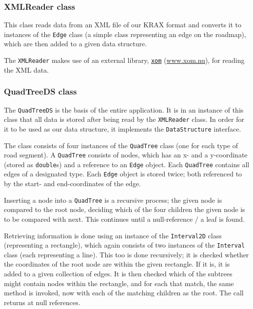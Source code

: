 \documentclass[a4paper,11pt]{article}
\begin{document}
\subsubsection{XMLReader class} %
This class reads data from an XML file of our KRAX format and converts it to instances of the \texttt{Edge} class (a simple class representing an edge on the roadmap), which are then added to a given data structure.

The \texttt{XMLReader} makes use of an external library, \href{www.xom.nu}{\texttt{xom}} (\url{www.xom.nu}), for reading the XML data.

\subsubsection{QuadTreeDS class} %
The \texttt{QuadTreeDS} is the basis of the entire application. It is in an instance of this class that all data is stored after being read by the \texttt{XMLReader} class. In order for it to be used as our data structure, it implements the \texttt{DataStructure} interface.

The class consists of four instances of the \texttt{QuadTree} class (one for each type of road segment). A \texttt{QuadTree} consists of nodes, which has an x- and a y-coordinate (stored as \texttt{double}s) and a reference to an \texttt{Edge} object. Each \texttt{QuadTree} contains all edges of a designated type. Each \texttt{Edge} object is stored twice; both referenced to by the start- and end-coordinates of the edge.

Inserting a node into a \texttt{QuadTree} is a recursive process; the given node is compared to the root node, deciding which of the four children the given node is to be compared with next. This continues until a null-reference / a leaf is found.

Retrieving information is done using an instance of the \texttt{Interval2D} class (representing a rectangle), which again consists of two instances of the \texttt{Interval} class (each representing a line). This too is done recursively; it is checked whether the coordinates of the root node are within the given rectangle. If it is, it is added to a given collection of edges. It is then checked which of the subtrees might contain nodes within the rectangle, and for each that match, the same method is invoked, now with each of the matching children as the root. The call returns at null references.
\end{document}
